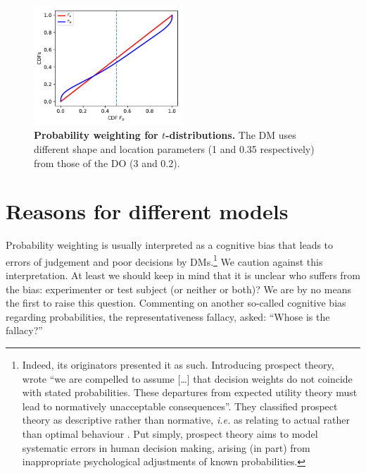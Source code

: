 \documentclass[%
	a4paper,
	abstract=true,	
	12pt,
	numbers=noenddot,
]{scrartcl}
\newcommand{\flabel}[1]{\label{fig:#1}}
\newcommand{\seclabel}[1]{\label{sec:#1}}
\newcommand{\ie}{\textit{i.e.}\xspace}
\newcommand{\ND}{\mathcal{N}} %
\begin{document}
\begin{figure}[htb]
\centering
\includegraphics[width=0.5\textwidth]{./figs/Student-t.pdf}
\caption{\textbf{Probability weighting for $t$-distributions.} The DM uses different shape and location parameters (1 and 0.35 respectively) from those of the DO (3 and 0.2).}
\flabel{Student-t}
\end{figure}



\FloatBarrier

\section{Reasons for different models\seclabel{Reasons_for}}
Probability weighting is usually interpreted as a cognitive bias that leads to errors of judgement and poor decisions by DMs.\footnote{Indeed, its originators presented it as such.
Introducing prospect theory, \textcite[p.~277]{KahnemanTversky1979} wrote ``we are compelled to assume [\dots] that decision weights do not coincide with stated probabilities. These departures from expected utility theory must lead to normatively unacceptable consequences''.
They classified prospect theory as descriptive rather than normative, \ie as relating to actual rather than optimal behaviour \parencite{TverskyKahneman1986}.
Put simply, prospect theory aims to model systematic errors in human decision making, arising (in part) from inappropriate psychological adjustments of known probabilities.}
We caution against this interpretation.
At least we should keep in mind that it is unclear who suffers from the bias: experimenter or test subject (or neither or both)?
We are by no means the first to raise this question.
Commenting on another so-called cognitive bias regarding probabilities, the representativeness fallacy, \textcite{Cohen1979a} asked: ``Whose is the fallacy?''
\end{document}
